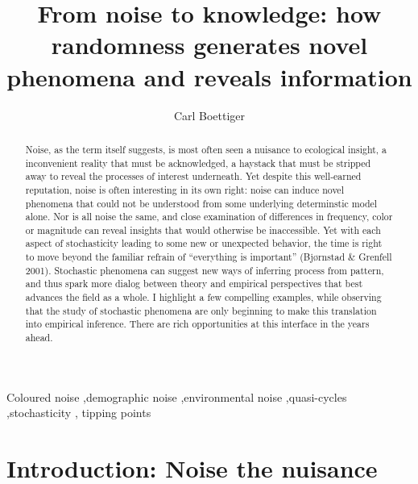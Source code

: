 \documentclass[
  authoryear,
  preprint]{elsarticle}
\begin{document}
\begin{frontmatter}
\title{From noise to knowledge: how randomness generates novel phenomena
and reveals information}
\author[1]{Carl Boettiger%
%
}



        
\begin{abstract}
Noise, as the term itself suggests, is most often seen a nuisance to
ecological insight, a inconvenient reality that must be acknowledged, a
haystack that must be stripped away to reveal the processes of interest
underneath. Yet despite this well-earned reputation, noise is often
interesting in its own right: noise can induce novel phenomena that
could not be understood from some underlying determinstic model alone.
Nor is all noise the same, and close examination of differences in
frequency, color or magnitude can reveal insights that would otherwise
be inaccessible. Yet with each aspect of stochasticity leading to some
new or unexpected behavior, the time is right to move beyond the
familiar refrain of ``everything is important'' (Bjørnstad \& Grenfell
2001). Stochastic phenomena can suggest new ways of inferring process
from pattern, and thus spark more dialog between theory and empirical
perspectives that best advances the field as a whole. I highlight a few
compelling examples, while observing that the study of stochastic
phenomena are only beginning to make this translation into empirical
inference. There are rich opportunities at this interface in the years
ahead.
\end{abstract}





\begin{keyword}
    Coloured noise \sep demographic noise \sep environmental
noise \sep quasi-cycles \sep stochasticity \sep 
    tipping points
\end{keyword}
\end{frontmatter}
    

\section{Introduction: Noise the
nuisance}\label{introduction-noise-the-nuisance}
\end{document}
